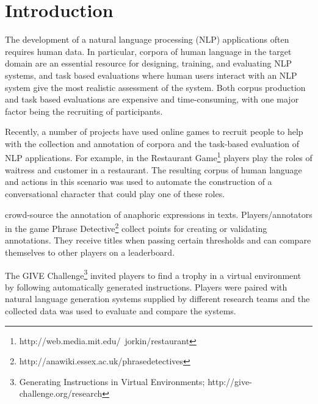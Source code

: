 
\section{Introduction}

The development of a natural language processing (NLP) applications
often requires human data. In particular, corpora of human language in
the target domain are an essential resource for designing, training,
and evaluating NLP systems, and task based evaluations where human
users interact with an NLP system give the most realistic assessment
of the system. Both corpus production and task based evaluations are
expensive and time-consuming, with one major factor being the
recruiting of participants.

Recently, a number of projects have used online games to recruit
people to help with the collection and annotation of corpora and the
task-based evaluation of NLP applications.  For example, in the
Restaurant Game\footnote{http://web.media.mit.edu/~jorkin/restaurant}
\cite{orkin-roy-2007} players play the roles of waitress and customer
in a restaurant. The resulting corpus of human language and actions in
this scenario was used to automate the construction of a
conversational character that could play one of these roles.

\cite{chamberlain-etal-2008} crowd-source the annotation of anaphoric
expressions in texts. Players/annotators in the game Phrase
Detective\footnote{http://anawiki.essex.ac.uk/phrasedetectives}
collect points for creating or validating annotations. They receive
titles when passing certain thresholds and can compare themselves to
other players on a leaderboard. 

The GIVE Challenge\footnote{Generating Instructions in Virtual
  Environments; http://give-challenge.org/research}
\cite{koller-etal-2010-give1-book,striegnitz-etal-2011-give25} invited
players to find a trophy in a virtual environment by following
automatically generated instructions. Players were paired with natural
language generation systems supplied by different research teams and
the collected data was used to evaluate and compare the systems.



